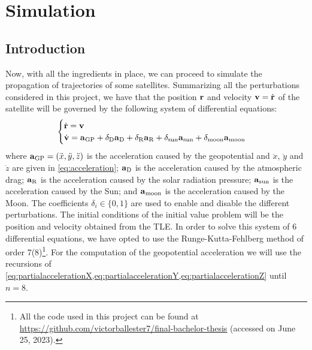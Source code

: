 \documentclass[../main.tex]{subfiles}
\begin{document}
\section{Simulation}\label{sec:simulation}
\subsection{Introduction}
Now, with all the ingredients in place, we can proceed to simulate the propagation of trajectories of some satellites.
Summarizing all the perturbations considered in this project, we have that the position $\boldsymbol{\mathrm{r}}$ and velocity $\boldsymbol{\mathrm{v}}=\dot{\boldsymbol{\mathrm{r}}}$ of the satellite will be governed by the following system of differential equations:
\begin{equation}
  \begin{cases}
    \dot{\boldsymbol{\mathrm{r}}}=\boldsymbol{\mathrm{v}} \\
    \dot{\boldsymbol{\mathrm{v}}}=\boldsymbol{\mathrm{a}}_{\mathrm{GP}} + \delta_{\mathrm{D}}\boldsymbol{\mathrm{a}}_{\mathrm{D}}+\delta_{\mathrm{R}}\boldsymbol{\mathrm{a}}_{\mathrm{R}}+\delta_{\mathrm{sun}}\boldsymbol{\mathrm{a}}_{\mathrm{sun}}+\delta_{\mathrm{moon}}\boldsymbol{\mathrm{a}}_\mathrm{moon}
  \end{cases}
\end{equation}
where $\boldsymbol{\mathrm{a}}_{\mathrm{GP}}=(\ddot{x},\ddot{y},\ddot{z})$ is the acceleration caused by the geopotential and $\ddot{x}$, $\ddot{y}$ and $\ddot{z}$ are given in \cref{eq:acceleration}; $\boldsymbol{\mathrm{a}}_{\mathrm{D}}$ is the acceleration caused by the atmospheric drag; $\boldsymbol{\mathrm{a}}_{\mathrm{R}}$ is the acceleration caused by the solar radiation pressure; $\boldsymbol{\mathrm{a}}_{\mathrm{sun}}$ is the acceleration caused by the Sun; and $\boldsymbol{\mathrm{a}}_{\mathrm{moon}}$ is the acceleration caused by the Moon. The coefficients $\delta_{i}\in\{0,1\}$ are used to enable and disable the different perturbations. The initial conditions of the initial value problem will be the position and velocity obtained from the TLE. In order to solve this system of 6 differential equations, we have opted to use the Runge-Kutta-Fehlberg method of order 7(8)\footnote{All the code used in this project can be found at \url{https://github.com/victorballester7/final-bachelor-thesis} (accessed on June 25, 2023).}. For the computation of the geopotential acceleration we will use the recursions of \cref{eq:partialaccelerationX,eq:partialaccelerationY,eq:partialaccelerationZ} until $n=8$.
\end{document}
